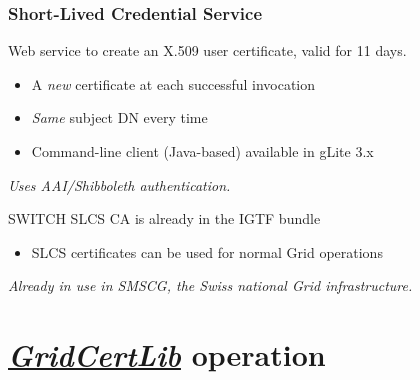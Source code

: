 \documentclass{beamer}
\newcommand{\+}{\vspace{1em}}
\newcommand{\GridCertLib}{\href{http://gridcertlib.googlecode.com/}{{\em GridCertLib}}}
\begin{document}
\begin{frame}[label=slcs]
  \frametitle{Short-Lived Credential Service}
  Web service to create an X.509 user certificate,
  valid for 11 days.
  \begin{itemize}
  \item A \emph{new} certificate at each successful invocation
  \item \emph{Same} subject DN every time
  \item Command-line client (Java-based) available in gLite 3.x
  \end{itemize}

  \+ {\em Uses AAI/Shibboleth authentication.}

  \+ SWITCH SLCS CA is already in the IGTF bundle
  \begin{itemize}
  \item SLCS certificates can be used for normal Grid operations
  \end{itemize}

  \+
  {\em Already in use in SMSCG, the Swiss national Grid infrastructure.}

  \+
  \hyperlink{more-slcs}{}
\end{frame}


\section[Project overview]{\GridCertLib{} operation}

\end{document}
